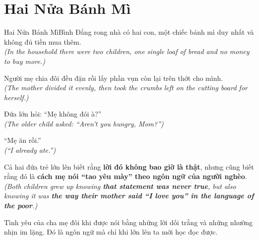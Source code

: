 \section{Hai Nửa Bánh Mì}
\begin{truyen}{Hai Nửa Bánh Mì}{Bình Đẳng}
rong nhà có hai con, một chiếc bánh mì duy nhất và không đủ tiền mua thêm.\\
\textit{(In the household there were two children, one single loaf of bread and no money to buy more.)}

Người mẹ chia đôi đều đặn rồi lấy phần vụn còn lại trên thớt cho mình.\\
\textit{(The mother divided it evenly, then took the crumbs left on the cutting board for herself.)}

Đứa lớn hỏi: ``Mẹ không đói à?''\\
\textit{(The older child asked: ``Aren't you hungry, Mom?'')}

``Mẹ ăn rồi.''\\
\textit{(``I already ate.'')}

Cả hai đứa trẻ lớn lên biết rằng \textbf{lời đó không bao giờ là thật}, nhưng cũng biết rằng đó là \textbf{cách mẹ nói ``tao yêu mày'' theo ngôn ngữ của người nghèo}.\\
\textit{(Both children grew up knowing \textbf{that statement was never true}, but also knowing it was \textbf{the way their mother said ``I love you'' in the language of the poor}.)}
\end{truyen}
\begin{baihoc}
  Tình yêu của cha mẹ đôi khi được nói bằng những lời dối trắng và những nhường nhịn im lặng. Đó là ngôn ngữ mà chỉ khi lớn lên ta mới học đọc được.
\end{baihoc}

